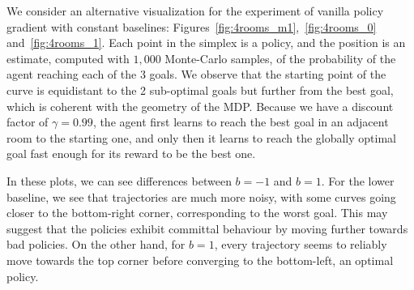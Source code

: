 We consider an alternative visualization for the experiment of vanilla policy gradient with constant baselines: Figures~\ref{fig:4rooms_m1},~\ref{fig:4rooms_0} and~\ref{fig:4rooms_1}. Each point in the simplex is a policy, and the position is an estimate, computed with $1,000$ Monte-Carlo samples, of the probability of the agent reaching each of the 3 goals. We observe that the starting point of the curve is equidistant to the 2 sub-optimal goals but further from the best goal, which is coherent with the geometry of the MDP. Because we have a discount factor of $\gamma = 0.99$, the agent first learns to reach the best goal in an adjacent room to the starting one, and only then it learns to reach the globally optimal goal fast enough for its reward to be the best one. 

In these plots, we can see differences between $b=-1$ and $b=1$. For the lower baseline, we see that trajectories are much more noisy, with some curves going closer to the bottom-right corner, corresponding to the worst goal. This may suggest that the policies exhibit committal behaviour by moving further towards bad policies. On the other hand, for $b=1$, every trajectory seems to reliably move towards the top corner before converging to the bottom-left, an optimal policy.

